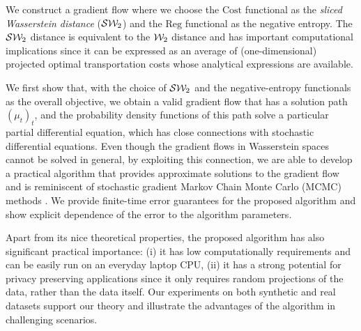We construct a gradient flow where we choose the $\mathrm{Cost}$ functional as the \textit{sliced Wasserstein distance} (${\cal S}{\cal W}_2$) \cite{bonneel2015sliced} and the $\mathrm{Reg}$ functional as the negative entropy. The ${\cal S}{\cal W}_2$ distance is equivalent to the ${\cal W}_2$ distance \cite{bonnotte2013unidimensional} and has important computational implications since it can be expressed as an average of (one-dimensional) projected optimal transportation costs whose analytical expressions are available.

We first show that, with the choice of ${\cal S}{\cal W}_2$ and the negative-entropy functionals as the overall objective, we obtain a valid gradient flow that has a solution path $(\mu_t)_t$, and the probability density functions of this path solve a particular partial differential equation, which has close connections with stochastic differential equations. Even though the gradient flows in Wasserstein spaces cannot be solved in general, by exploiting this connection, we are able to develop a practical algorithm that provides approximate solutions to the gradient flow and is reminiscent of stochastic gradient Markov Chain Monte Carlo (MCMC) methods \cite{WelTeh2011a,raginsky17a}. We provide finite-time error guarantees for the proposed algorithm and show explicit dependence of the error to the algorithm parameters.

Apart from its nice theoretical properties, the proposed algorithm has also significant practical importance: (i) it has low computationally requirements and can be easily run on an everyday laptop CPU, (ii) it has a strong potential for privacy preserving applications since it only requires random projections of the data, rather than the data itself. Our experiments on both synthetic and real datasets support our theory and illustrate the advantages of the algorithm in challenging scenarios.






